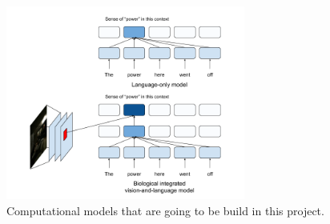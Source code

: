 \documentclass[letterpaper, 12pt]{article}
\begin{document}
\begin{figure}[h]
\begin{center}
\includegraphics[width=0.7\textwidth,keepaspectratio]{model_figure}
\end{center}
    \caption{Computational models that are going to be build in this project.}
\end{figure}

\newpage

% 
\end{document}
